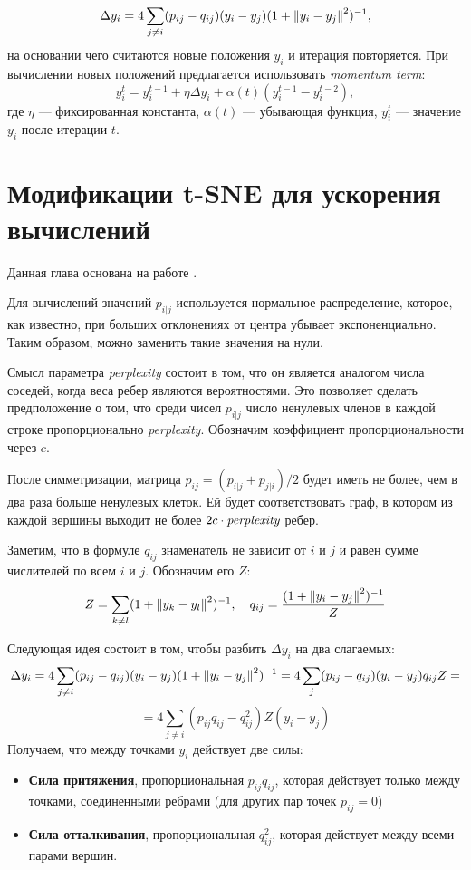 $$\Delta y_i = 4 \sum_{j\neq i} (p_{ij} - q_{ij}) (y_i - y_j) (1 + \left\lVert y_i - y_j\right\rVert^2)^{-1},$$
на основании чего считаются новые положения $y_i$ и итерация повторяется. При вычислении новых положений предлагается использовать {\itshape momentum term}:
$$y_i^{t} = y_i^{t - 1} + \eta \Delta y_i + \alpha(t)(y_i^{t - 1} - y_i^{t - 2}),$$
где $\eta$ --- фиксированная константа, $\alpha(t)$ --- убывающая функция, $y_i^t$ --- значение $y_i$ после итерации $t$.

\section{Модификации t-SNE для ускорения вычислений}

Данная глава основана на работе \cite{acc_tsne}.

Для вычислений значений $p_{i|j}$ используется нормальное распределение, которое, как известно, при больших отклонениях от центра убывает экспоненциально. Таким образом, можно заменить такие значения на нули.

Смысл параметра {\itshape perplexity} состоит в том, что он является аналогом числа соседей, когда веса ребер являются вероятностями. Это позволяет сделать предположение о том, что среди чисел $p_{i|j}$ число ненулевых членов в каждой строке пропорционально {\itshape perplexity}. Обозначим коэффициент пропорциональности через $c$.

После симметризации, матрица $p_{ij} = (p_{i|j} + p_{j|i}) / 2$ будет иметь не более, чем в два раза больше ненулевых клеток. Ей будет соответствовать граф, в котором из каждой вершины выходит не более $2 c \cdot \mbox{\itshape perplexity}$ ребер.

Заметим, что в формуле $q_{ij}$ знаменатель не зависит от $i$ и $j$ и равен сумме числителей по всем $i$ и $j$. Обозначим его $Z$:
$$Z = \sum_{k\neq l} (1 + \left\lVert y_k - y_l\right\rVert^2)^{-1}, \quad q_{ij} =\frac{(1 + \left\lVert y_i - y_j\right\rVert^2)^{-1}}{Z} $$

Следующая идея состоит в том, чтобы разбить $\Delta y_i$ на два слагаемых:
$$\Delta y_i = 4 \sum_{j\neq i} (p_{ij} - q_{ij}) (y_i - y_j) (1 + \left\lVert y_i - y_j\right\rVert^2)^{-1} = 4 \sum_j (p_{ij} - q_{ij}) (y_i - y_j) q_{ij} Z = $$
$$ = 4\sum_{j\neq i}(p_{ij}q_{ij} - q_{ij}^2)Z(y_i - y_j)$$
Получаем, что между точками $y_{i}$ действует две силы:
\begin{itemize}
\item {\bfseries Сила притяжения}, пропорциональная $p_{ij}q_{ij}$, которая действует только между точками, соединенными ребрами (для других пар точек $p_{ij} = 0$)
\item {\bfseries Сила отталкивания}, пропорциональная $q_{ij}^2$, которая действует между всеми парами вершин.
\end{itemize}


